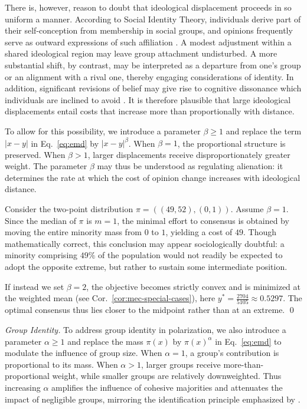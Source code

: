 There is, however, reason to doubt that ideological displacement proceeds in so uniform a manner. 
According to Social Identity Theory, individuals derive part of their self-conception from membership in social groups, and opinions frequently serve as outward expressions of such affiliation \cite{TajfelTurner1979}.
A modest adjustment within a shared ideological region may leave group attachment undisturbed. 
A more substantial shift, by contrast, may be interpreted as a departure from one's group or an alignment with a rival one, thereby engaging considerations of identity. 
In addition, significant revisions of belief may give rise to cognitive dissonance which individuals are inclined to avoid \cite{Festinger1957}.
It is therefore plausible that large ideological displacements entail costs that increase more than proportionally with distance.

To allow for this possibility, we introduce a parameter $\beta \geq 1$ and replace the term $|x-y|$ in Eq.~\ref{eq:emd} by $|x-y|^{\beta}$. 
When $\beta=1$, the proportional structure is preserved. 
When $\beta>1$, larger displacements receive disproportionately greater weight. 
The parameter $\beta$ may thus be understood as regulating alienation: it determines the rate at which the cost of opinion change increases with ideological distance.

\begin{example} Consider the two-point distribution
\(
\pi = ((49,52),(0,1)).
\)
Assume $\beta = 1$.  Since the median of $\pi$ is $m=1$, the minimal effort to consensus is obtained by moving the entire minority mass from $0$ to $1$, yielding a cost of $49$.
Though mathematically correct, this conclusion may appear sociologically doubtful: a minority comprising $49\%$ of the population would not readily be expected to adopt the opposite extreme, but rather to sustain some intermediate position.

If instead we set $\beta=2$, the objective becomes strictly convex and is minimized at the weighted mean (see Cor.~\ref{cor:mec-special-cases}), here $y^*=\frac{2704}{5105}\approx 0.5297.$
The optimal consensus thus lies closer to the midpoint rather than at an extreme.
\qed
\end{example}

\emph{Group Identity.} To address group identity in polarization, we also introduce a parameter $\alpha \geq 1$  and replace the mass $\pi(x)$ by $\pi(x)^\alpha$ in Eq.~\ref{eq:emd} to modulate the influence of group size. When $\alpha = 1$, a group's contribution is proportional to its mass.
When $\alpha > 1$, larger groups receive more-than-proportional weight, while smaller groups are relatively downweighted.
Thus increasing $\alpha$ amplifies the influence of cohesive majorities and attenuates the impact of negligible groups, mirroring the identification principle emphasized by \cite{esteban1994measurement}.

